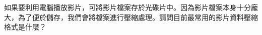 \ifx\ntpcNinetyThree\undefined[93學年基北區] \fi
\label{ntpc-93-p38} 如果要利用電腦播放影片，可將影片檔案存於光碟片中。因為影片檔案本身十分龐大，為了便於儲存，我們會將檔案進行壓縮處理。請問目前最常用的影片資料壓縮格式是什麼？ \underlineblank{\ref{ntpc-93-p38}}